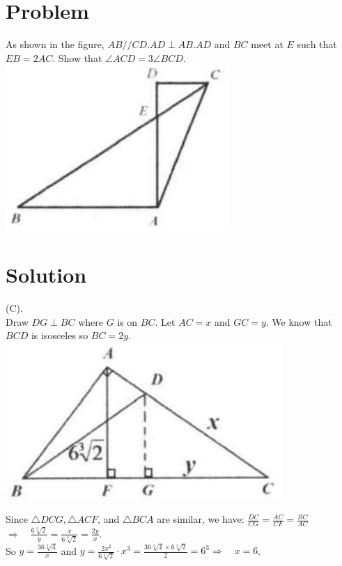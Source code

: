 \documentclass{article}
\begin{document}
\section*{Problem}
As shown in the figure, \(A B / / C D . A D \perp A B . A D\) and \(B C\) meet at \(E\) such that \(E B=2 A C\). Show that \(\angle A C D=3 \angle B C D\).\\
\centering
\includegraphics[width=\textwidth]{images/016(2).jpg}

\section*{Solution}
(C).\\
Draw \(D G \perp B C\) where \(G\) is on \(B C\). Let \(A C=x\) and \(G C=y\). We know that \(B C D\) is isosceles so \(B C=2 y\).\\
\centering
\includegraphics[width=\textwidth]{images/094(1).jpg}


Since \(\triangle D C G, \triangle A C F\), and \(\triangle B C A\) are similar, we have: \(\frac{D C}{C G}=\frac{A C}{C F}=\frac{B C}{A C}\)\\
\(\Rightarrow \quad \frac{6 \sqrt[3]{2}}{y}=\frac{x}{6 \sqrt[3]{2}}=\frac{2 y}{x}\).\\
So \(y=\frac{36 \sqrt[3]{4}}{x}\) and \(y=\frac{2 x^{2}}{6 \sqrt[3]{2}} \cdot x^{3}=\frac{36 \sqrt[3]{4} \times 6 \sqrt[3]{2}}{2}=6^{3} \Rightarrow \quad x=6\).\\
\end{document}
